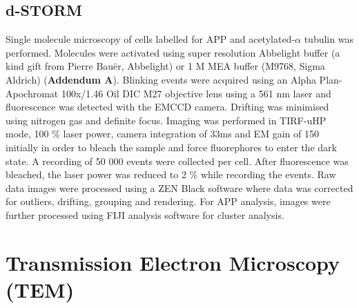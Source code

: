 \subsection{d-STORM}
Single molecule microscopy of cells labelled for APP and acetylated-$\alpha$ tubulin was performed. Molecules were activated using super resolution Abbelight buffer (a kind gift from Pierre Bauër, Abbelight) or 1 M MEA buffer (M9768, Sigma Aldrich) (\textbf{Addendum A}). Blinking events were acquired using an Alpha Plan-Apochromat 100x/1.46 Oil DIC M27 objective lens using a 561 nm laser and fluorescence was detected with the EMCCD camera. Drifting was minimised using nitrogen gas and definite focus. Imaging was performed in TIRF-uHP mode, 100 \% laser power, camera integration of 33ms and EM gain of 150 initially in order to bleach the sample and force fluorephores to enter the dark state. A recording of 50 000 events were collected per cell. After fluorescence was bleached, the laser power was reduced to 2 \% while recording the events. Raw data images were processed using a ZEN Black software where data was corrected for outliers, drifting, grouping and rendering. For APP analysis, images were further processed using FIJI analysis software for cluster analysis. 

\section{Transmission Electron Microscopy (TEM)}
